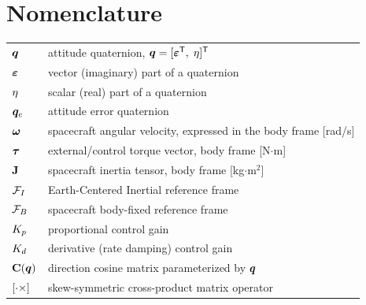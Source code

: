 \section*{Nomenclature}
\begin{tabular}{@{}p{2.2cm}@{}p{13.5cm}@{}}
$\bm{q}$        & attitude quaternion, $\bm{q} = [\bm{\varepsilon}^{\mathsf{T}},\; \eta]^{\mathsf{T}}$ \\
$\bm{\varepsilon}$           & vector (imaginary) part of a quaternion \\
$\eta$        & scalar (real) part of a quaternion \\
$\bm{q}_{e}$           & attitude error quaternion \\
$\bm{\omega}$         & spacecraft angular velocity, expressed in the body frame [rad/s] \\
$\bm{\tau}$         & external/control torque vector, body frame [N$\cdot$m] \\
$\mathbf{J}$        & spacecraft inertia tensor, body frame [kg$\cdot$m$^2$] \\
$\mathcal{F}_I$            & Earth-Centered Inertial reference frame \\
$\mathcal{F}_B$           & spacecraft body-fixed reference frame \\
$K_{p}$         & proportional control gain \\
$K_{d}$         & derivative (rate damping) control gain \\
$\mathbf{C}(\bm{q})$ & direction cosine matrix parameterized by $\bm{q}$ \\
$[\cdot\times]$    & skew-symmetric cross-product matrix operator \\
\end{tabular}

\clearpage
